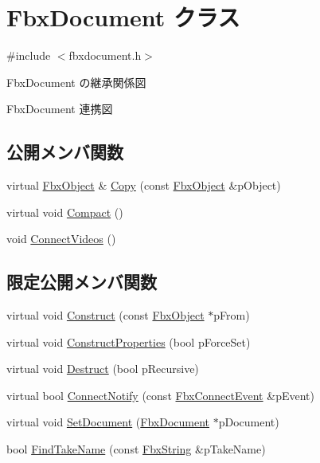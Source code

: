 \hypertarget{class_fbx_document}{}\section{Fbx\+Document クラス}
\label{class_fbx_document}


{\ttfamily \#include $<$fbxdocument.\+h$>$}



Fbx\+Document の継承関係図


Fbx\+Document 連携図
\subsection*{公開メンバ関数}
\begin{DoxyCompactItemize}
\item 
virtual \hyperlink{class_fbx_object}{Fbx\+Object} \& \hyperlink{class_fbx_document_a6a345cc64e4ee39a6fd719b56d50dfac}{Copy} (const \hyperlink{class_fbx_object}{Fbx\+Object} \&p\+Object)
\item 
virtual void \hyperlink{class_fbx_document_a62a41699423c0431a1e0969e9dea176d}{Compact} ()
\item 
void \hyperlink{class_fbx_document_a1d4dc5bd8518bd2e37f1b13aa950350f}{Connect\+Videos} ()
\end{DoxyCompactItemize}
\subsection*{限定公開メンバ関数}
\begin{DoxyCompactItemize}
\item 
virtual void \hyperlink{class_fbx_document_a9bc37787619a99fca90b839c16e4f2b8}{Construct} (const \hyperlink{class_fbx_object}{Fbx\+Object} $\ast$p\+From)
\item 
virtual void \hyperlink{class_fbx_document_a10a4a36c6d252d72036abc1f9d02aeee}{Construct\+Properties} (bool p\+Force\+Set)
\item 
virtual void \hyperlink{class_fbx_document_a172d19ae540cbd086ade62adaf1a54b8}{Destruct} (bool p\+Recursive)
\item 
virtual bool \hyperlink{class_fbx_document_a7c3b910b2d44729973266e32733da3fb}{Connect\+Notify} (const \hyperlink{class_fbx_connect_event}{Fbx\+Connect\+Event} \&p\+Event)
\item 
virtual void \hyperlink{class_fbx_document_a063190c324b6fb999b4ac2a1169c2aab}{Set\+Document} (\hyperlink{class_fbx_document}{Fbx\+Document} $\ast$p\+Document)
\item 
bool \hyperlink{class_fbx_document_aefcce26df173f0391b6540c003c52ea9}{Find\+Take\+Name} (const \hyperlink{class_fbx_string}{Fbx\+String} \&p\+Take\+Name)
\end{DoxyCompactItemize}
